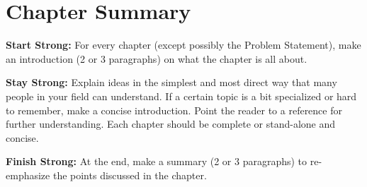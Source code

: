 \section{Chapter Summary}

\textbf{Start Strong:} For every chapter (except possibly the Problem Statement), make an introduction (2 or 3 paragraphs) on what the chapter is all about.

\textbf{Stay Strong:} Explain ideas in the simplest and most direct way that many people in your field can understand. If a certain topic is a bit specialized or hard to remember, make a concise introduction. Point the reader to a reference for further understanding. Each chapter should be complete or stand-alone and concise.

\textbf{Finish Strong:} At the end, make a summary (2 or 3 paragraphs) to re-emphasize the points discussed in the chapter.
